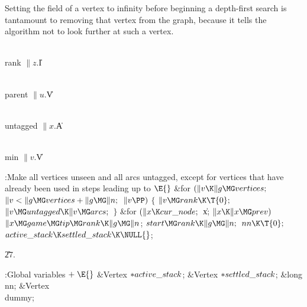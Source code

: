 Setting the  field of a vertex to infinity before beginning
a depth-first search is tantamount to removing that vertex from
the graph, because it tells the algorithm not to look further at
such a vertex.

\Y\B\4\D\\{rank}\5
$\|z.{}$\|I\par
\B\4\D\\{parent}\5
$\|u.{}$\|V\par
\B\4\D\\{untagged}\5
$\|x.{}$\|A\par
\B\4\D\\{min}\5
$\|v.{}$\|V%
\par
\Y\B\4:Make all vertices unseen and all arcs untagged, except for vertices
that have already been used in steps leading up to \X${}\E{}$%
\6
\&{for} ${}(\|v\K\|g\MG\\{vertices};{}$ ${}\|v<\|g\MG\\{vertices}+\|g\MG\|n;{}$
${}\|v\PP){}$\5
${}\{{}$\1\6
${}\|v\MG\\{rank}\K\T{0};{}$\6
${}\|v\MG\\{untagged}\K\|v\MG\\{arcs};{}$\6
\4${}\}{}$\2\6
\&{for} ${}(\|x\K\\{cur\_node};{}$ \|x; ${}\|x\K\|x\MG\\{prev}){}$\1\5
${}\|x\MG\\{game}\MG\\{tip}\MG\\{rank}\K\|g\MG\|n{}$;\2\6
${}\\{start}\MG\\{rank}\K\|g\MG\|n;{}$\6
${}\\{nn}\K\T{0};{}$\6
${}\\{active\_stack}\K\\{settled\_stack}\K\NULL{}$;\par
\U27.\fi

\B{}:Global variables\X${}\mathrel+\E{}$\6
\&{Vertex} ${}{*}\\{active\_stack}{}$;\6
\&{Vertex} ${}{*}\\{settled\_stack}{}$;\6
\&{long} \\{nn};\6
\&{Vertex} \\{dummy};\par
\fi

